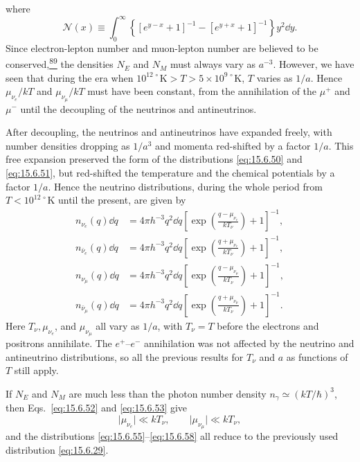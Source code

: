 where
\begin{equation}
  \mathscr N(x)
  \equiv
  \int_0^\infty
  \left\{
    [e^{y-x}+1]^{-1}
    -
    [e^{y+x}+1]^{-1}
  \right\}y^2\dd y.
  \tag{15.6.54}\label{eq:15.6.54}
\end{equation}
Since electron-lepton number and muon-lepton number are believed to be
conserved,\hyperref[ch15-ref-89]{\textsuperscript{89}} the densities \(N_E\)
and \(N_M\) must always vary as \(a^{-3}\). However, we have seen that during
the era when
\(10^{12\,\circ}\mathrm K>T>5\times10^{9\,\circ}\mathrm K\), \(T\) varies
as \(1/a\). Hence \(\mu_{\nu_e}/kT\) and \(\mu_{\nu_\mu}/kT\) must have been
constant, from the annihilation of the \(\mu^+\) and \(\mu^-\) until the
decoupling of the neutrinos and antineutrinos.

After decoupling, the neutrinos and antineutrinos have expanded freely, with
number densities dropping as \(1/a^3\) and momenta red-shifted by a factor
\(1/a\). This free expansion preserved the form of the distributions
\eqref{eq:15.6.50} and \eqref{eq:15.6.51}, but red-shifted the temperature and
the chemical potentials by a factor \(1/a\). Hence the neutrino distributions,
during the whole period from \(T<10^{12\,\circ}\mathrm K\) until the present,
are given by
\begin{align}
  n_{\nu_e}(q)\dd q
  &=
  4\pi h^{-3}q^2\dd q
  \left[
    \exp\left(\frac{q-\mu_{\nu_e}}{kT_\nu}\right)+1
  \right]^{-1},
  \tag{15.6.55}\label{eq:15.6.55}\\
  n_{\bar\nu_e}(q)\dd q
  &=
  4\pi h^{-3}q^2\dd q
  \left[
    \exp\left(\frac{q+\mu_{\nu_e}}{kT_\nu}\right)+1
  \right]^{-1},
  \tag{15.6.56}\label{eq:15.6.56}\\
  n_{\nu_\mu}(q)\dd q
  &=
  4\pi h^{-3}q^2\dd q
  \left[
    \exp\left(\frac{q-\mu_{\nu_\mu}}{kT_\nu}\right)+1
  \right]^{-1},
  \tag{15.6.57}\label{eq:15.6.57}\\
  n_{\bar\nu_\mu}(q)\dd q
  &=
  4\pi h^{-3}q^2\dd q
  \left[
    \exp\left(\frac{q+\mu_{\nu_\mu}}{kT_\nu}\right)+1
  \right]^{-1}.
  \tag{15.6.58}\label{eq:15.6.58}
\end{align}
Here \(T_\nu,\mu_{\nu_e}\), and \(\mu_{\nu_\mu}\) all vary as \(1/a\), with
\(T_\nu=T\) before the electrons and positrons annihilate. The
\(e^+\)--\(e^-\) annihilation was not affected by the neutrino and
antineutrino distributions, so all the previous results for \(T_\nu\) and
\(a\) as functions of \(T\) still apply.

If \(N_E\) and \(N_M\) are much less than the photon number density
\(n_\gamma\simeq(kT/\hbar)^3\), then Eqs.~\eqref{eq:15.6.52} and
\eqref{eq:15.6.53} give
\begin{equation}
  \lvert\mu_{\nu_e}\rvert\ll kT_\nu,
  \qquad
  \lvert\mu_{\nu_\mu}\rvert\ll kT_\nu,
  \tag{15.6.59}\label{eq:15.6.59}
\end{equation}
and the distributions \eqref{eq:15.6.55}--\eqref{eq:15.6.58} all reduce to
the previously used distribution \eqref{eq:15.6.29}.

